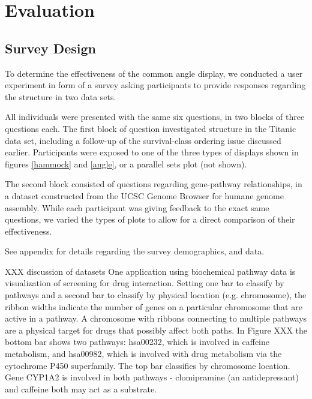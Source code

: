 \section{Evaluation}
\subsection{Survey Design}
To determine the effectiveness of the common angle display, we conducted a user experiment in form of a survey asking participants to provide responses regarding the structure in two data sets.

 All individuals were presented with the same six questions, in two blocks of three questions each. The first block of question investigated structure in the Titanic data set, including a follow-up of the survival-class ordering issue discussed earlier. Participants were exposed to one of the three types of displays shown in figures \ref{hammock} and \ref{angle}, or a parallel sets plot (not shown).
 
 The second block consisted of questions regarding gene-pathway relationships, in a dataset constructed from the UCSC Genome Browser \cite{ucsc:2002} for humane genome assembly. 
 While each participant was giving feedback to the exact same questions, we varied the types of plots to allow for a direct comparison of their effectiveness.




%

% 


See appendix for details regarding the survey demographics, and data.

XXX discussion of datasets
One application using biochemical pathway data is visualization of screening for drug interaction. Setting one bar to classify by pathways and a second bar to classify by physical location (e.g. chromosome), the ribbon widths indicate the number of genes on a particular chromosome that are active in a pathway. A chromosome with ribbons connecting to multiple pathways are a physical target for drugs that possibly affect both paths. In Figure XXX the bottom bar shows two pathways: hsa00232, which is involved in caffeine metabolism, and hsa00982, which is involved with drug metabolism via the cytochrome P450 superfamily. The top bar classifies by chromosome location. Gene CYP1A2 is involved in both pathways - clomipramine (an antidepressant) and caffeine both may act as a substrate.



